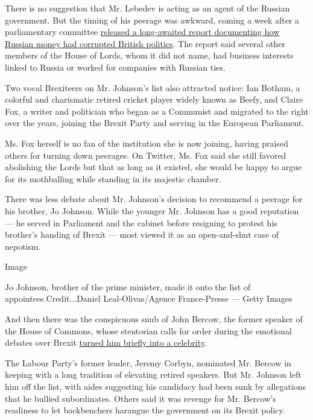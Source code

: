 There is no suggestion that Mr. Lebedev is acting as an agent of the
Russian government. But the timing of his peerage was awkward, coming a
week after a parliamentary committee
\href{https://www.nytimes3xbfgragh.onion/2020/07/21/world/europe/uk-russia-report-brexit-interference.html}{released
a long-awaited report documenting how Russian money had corrupted
British politics}. The report said several other members of the House of
Lords, whom it did not name, had business interests linked to Russia or
worked for companies with Russian ties.

Two vocal Brexiteers on Mr. Johnson's list also attracted notice: Ian
Botham, a colorful and charismatic retired cricket player widely known
as Beefy, and Claire Fox, a writer and politician who began as a
Communist and migrated to the right over the years, joining the Brexit
Party and serving in the European Parliament.

Ms. Fox herself is no fan of the institution she is now joining, having
praised others for turning down peerages. On Twitter, Ms. Fox said she
still favored abolishing the Lords but that as long as it existed, she
would be happy to argue for its mothballing while standing in its
majestic chamber.

There was less debate about Mr. Johnson's decision to recommend a
peerage for his brother, Jo Johnson. While the younger Mr. Johnson has a
good reputation --- he served in Parliament and the cabinet before
resigning to protest his brother's handing of Brexit --- most viewed it
as an open-and-shut case of nepotism.

Image

Jo Johnson, brother of the prime minister, made it onto the list of
appointees.Credit...Daniel Leal-Olivas/Agence France-Presse --- Getty
Images

And then there was the conspicuous snub of John Bercow, the former
speaker of the House of Commons, whose stentorian calls for order during
the emotional debates over Brexit
\href{https://www.nytimes3xbfgragh.onion/2019/10/31/world/europe/british-parliament-speaker-john-bercow-resigns.html}{turned
him briefly into a celebrity}.

The Labour Party's former leader, Jeremy Corbyn, nominated Mr. Bercow in
keeping with a long tradition of elevating retired speakers. But Mr.
Johnson left him off the list, with aides suggesting his candidacy had
been sunk by allegations that he bullied subordinates. Others said it
was revenge for Mr. Bercow's readiness to let backbenchers harangue the
government on its Brexit policy.


